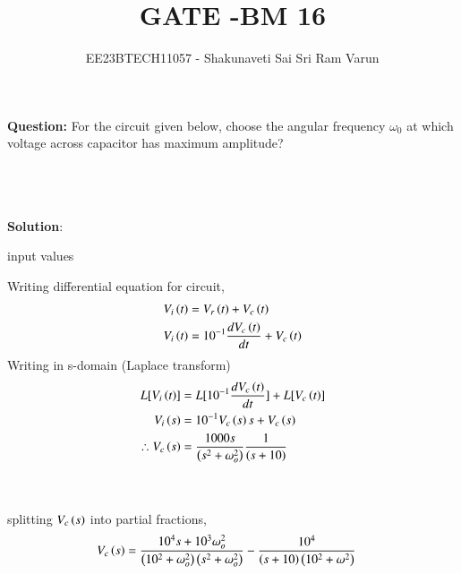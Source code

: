 \documentclass[journal,12pt,twocolumn]{IEEEtran}
\theoremstyle{remark}
\begin{document}

\vspace{3cm}

\title{GATE -BM 16}
\author{EE23BTECH11057 - Shakunaveti Sai Sri Ram Varun$^{}$%
}
\maketitle
\newpage
\bigskip
\vspace{2cm}
\textbf{Question: }
For the circuit given below, choose the angular frequency $ \omega_0$ at which voltage across capacitor has maximum amplitude?\\\\
\\\\
\textbf{Solution}:\\
\begin{table}[htbp] 
\centering

\caption{input values}
\label{tab: table-bm16}
\end{table}
Writing differential equation for circuit,
\begin{align}
V_i\left(t\right) &= V_r\left(t\right) + V_c\left(t\right)\\
V_i\left(t\right) &= 10^{-1}\frac{dV_c\left(t\right)}{dt} + V_c\left(t\right)
\end{align}
Writing in s-domain (Laplace transform)
\begin{align}
L[V_i\left(t\right)] &= L[10^{-1}\frac{dV_c\left(t\right)}{dt}] + L[V_c\left(t\right)]\\
V_i\left(s\right) &= 10^{-1}V_c\left(s\right)s + V_c\left(s\right)\\
\therefore V_c\left(s\right) &= \frac{1000s}{\left(s^2+ \omega_o^2\right)}\frac{1}{(s+10)}
\end{align}
\\\\
splitting $ V_c\left(s\right)$ into partial fractions,
\begin{align}
V_c\left(s\right) &= \frac{10^4s+10^3\omega_o^2}{\left(10^2+\omega_o^2\right)\left(s^2+\omega_o^2\right)}-\frac{10^4}{\left(s+10\right)\left(10^2+\omega^2\right)}
\end{align}
\end{document}
